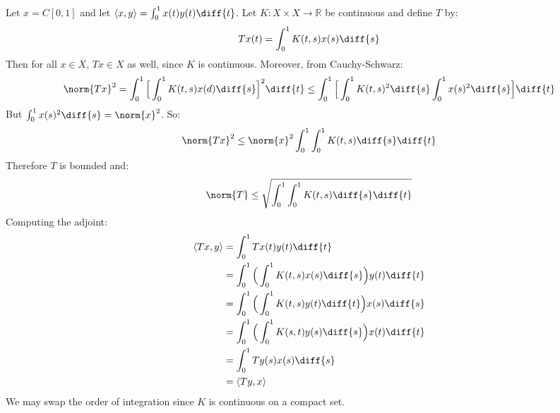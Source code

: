 \documentclass[crop=false,class=book,oneside]{standalone}
\begin{document}
            \begin{example}
                Let $x=C[0,1]$ and let
                $\langle{x,y}\rangle=\int_{0}^{1}x(t)y(t)\diff{t}$.
                Let $K:X\times{X}\rightarrow\mathbb{R}$ be continuous
                and define $T$ by:
                \begin{equation*}
                    Tx(t)=\int_{0}^{1}K(t,s)x(s)\diff{s}
                \end{equation*}
                Then for all $x\in{X}$, $Tx\in{X}$ as well,
                since $K$ is continuous. Moreover, from Cauchy-Schwarz:
                \begin{equation*}
                    \norm{Tx}^{2}
                    =\int_{0}^{1}
                    \Big[\int_{0}^{1}K(t,s)x(d)\diff{s}\Big]^{2}\diff{t}
                    \leq\int_{0}^{1}
                    \Big[\int_{0}^{1}K(t,s)^{2}\diff{s}
                    \int_{0}^{1}x(s)^{2}\diff{s}\Big]\diff{t}
                \end{equation*}
                But $\int_{0}^{1}x(s)^{2}\diff{s}=\norm{x}^{2}$. So:
                \begin{equation*}
                    \norm{Tx}^{2}\leq
                    \norm{x}^{2}\int_{0}^{1}\int_{0}^{1}
                    K(t,s)\diff{s}\diff{t}
                \end{equation*}
                Therefore $T$ is bounded and:
                \begin{equation*}
                    \norm{T}\leq
                    \sqrt{\int_{0}^{1}\int_{0}^{1}K(t,s)\diff{s}\diff{t}}
                \end{equation*}
                Computing the adjoint:
                \begin{align*}
                    \langle{Tx,y}\rangle
                    &=\int_{0}^{1}Tx(t)y(t)\diff{t}\\
                    &=\int_{0}^{1}\Big(
                    \int_{0}^{1}K(t,s)x(s)\diff{s}\Big)
                    y(t)\diff{t}\\
                    &=\int_{0}^{1}\Big(
                    \int_{0}^{1}K(t,s)y(t)\diff{t}\Big)
                    x(s)\diff{s}\\
                    &=\int_{0}^{1}\Big(
                    \int_{0}^{1}K(s,t)y(s)\diff{s}\Big)
                    x(t)\diff{t}\\
                    &=\int_{0}^{1}Ty(s)x(s)\diff{s}\\
                    &=\langle{Ty,x}\rangle
                \end{align*}
                We may swap the order of integration since $K$
                is continuous on a compact set.
            \end{example}
\end{document}
